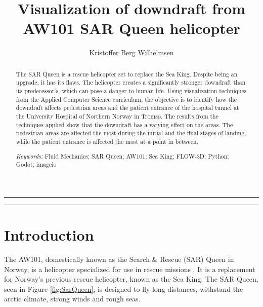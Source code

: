 \documentclass[a4paper,11pt]{extarticle}
\title{Visualization of downdraft from AW101 SAR Queen helicopter}
\author{Kristoffer Berg Wilhelmsen}
\date{\parbox{\linewidth}{\centering
    \textit{\small UiT - The Arctic University of Norway, P.O. Box 385, N-8505 Narvik, Norway}\endgraf\bigskip
    \small Submitted \today
}}
\providecommand{\keywords}[1]{\flushleft\textit{\small{Keywords:}} #1}
\begin{document}
\maketitle

\noindent\rule{\linewidth}{.5pt}
\begin{abstract}
  The SAR Queen is a rescue helicopter set to replace the Sea King. Despite being an upgrade, it has its flaws. The helicopter creates a significantly stronger downdraft than its predecessor's, which can pose a danger to human life. Using visualization techniques from the Applied Computer Science curriculum, the objective is to identify how the downdraft affects pedestrian areas and the patient entrance of the hospital tunnel at the University Hospital of Northern Norway in Tromsø. The results from the techniques applied show that the downdraft has a varying effect on the areas. The pedestrian areas are affected the most during the initial and the final stages of landing, while the patient entrance is affected the most at a point in between.

  \keywords{\small{Fluid Mechanics}; \small{SAR Queen}; \small{AW101}; \small{Sea King}; \small{FLOW-3D}; \small{Python}; \small{Godot}; \small{imageio}}
\end{abstract}
\rule{\linewidth}{.5pt}


\section{Introduction}
The AW101, domestically known as the Search \& Rescue (SAR) Queen in Norway, is a helicopter specialized for use in rescue missions \citep{ProjectDescription}. It is a replacement for Norway's previous rescue helicopter, known as the Sea King. The SAR Queen, seen in Figure \ref{fig:SarQueen}, is designed to fly long distances, withstand the arctic climate, strong winds and rough seas.
\end{document}
